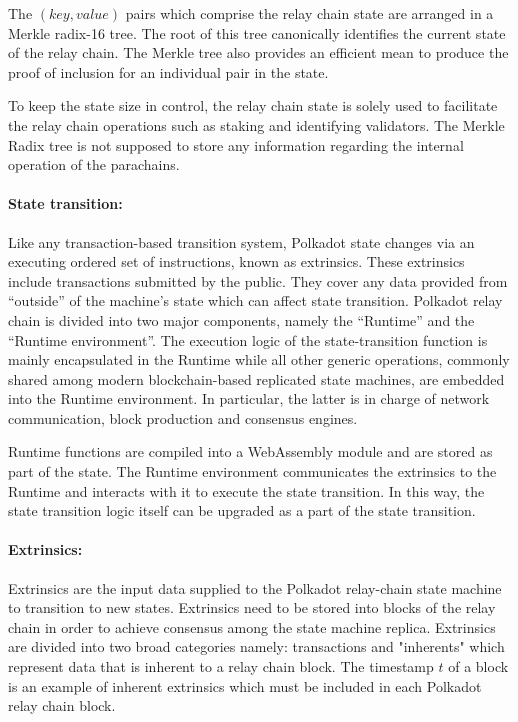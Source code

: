 \documentclass{article}
\begin{document}
The $(key, value)$ pairs which comprise the relay chain state are arranged in a Merkle radix-16 tree. The root of this tree canonically identifies the current state of the relay chain. The Merkle tree also provides an efficient mean to produce the  proof of inclusion for an individual pair in the state.

To keep the state size in control, the relay chain state is solely used to facilitate the relay chain operations such as staking and identifying validators. The Merkle Radix tree is not supposed to store any information regarding the internal operation of the parachains.

\paragraph{State transition: } \label{par:state_transition} Like any transaction-based transition system, Polkadot state changes via an executing ordered set of instructions, known as extrinsics. These extrinsics include transactions submitted by the public. They cover any data provided from ``outside'' of the machine's state which can affect state transition. Polkadot relay chain is divided into two major components, namely the ``Runtime'' and the ``Runtime environment''. The execution logic of the state-transition function is mainly encapsulated in the Runtime while all other generic operations, commonly shared among modern blockchain-based replicated state machines, are embedded into the Runtime environment. In particular, the latter is in charge of network communication, block production and consensus engines.

Runtime functions are compiled into a WebAssembly module and are stored as part of the state. The Runtime environment communicates the extrinsics to the Runtime and interacts with it to execute the state transition. In this way, the state transition logic itself can be upgraded as a part of the state transition.

\paragraph{Extrinsics:} \label{par:extrinsics}

Extrinsics are the input data supplied to the Polkadot relay-chain state machine to transition to new states. Extrinsics need to be stored into blocks of the relay chain in order to achieve consensus among the state machine replica. Extrinsics are divided into two broad categories namely: transactions and "inherents" which represent data that is inherent to a relay chain block. The timestamp $t$ of a block is an example of inherent extrinsics which must be included in each Polkadot relay chain block.
\end{document}
